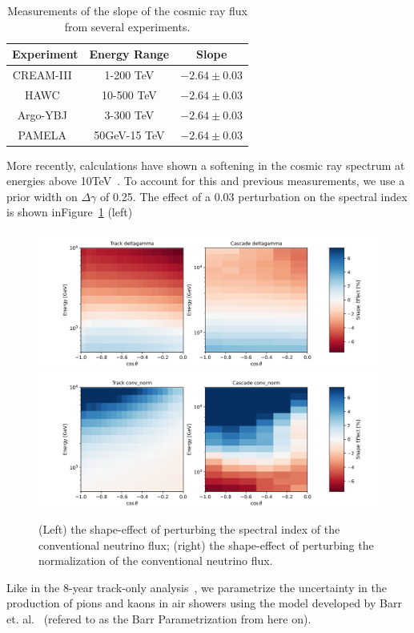 \documentclass[main.tex]{subfiles}
\begin{document}
\begin{table}
    \centering
    \begin{tabular}{|c | cc|}\hline
        Experiment & Energy Range & Slope \\\hline
        CREAM-III~\cite{Yoon_2017} & 1-200 TeV & $-2.64\pm 0.03$ \\
        HAWC~\cite{PhysRevD.96.122001} & 10-500 TeV & $-2.64\pm 0.03$ \\
        Argo-YBJ~\cite{IACOVACCI2013157} & 3-300 TeV & $-2.64\pm 0.03$ \\
        PAMELA~\cite{astra-7-235-2011} & 50GeV-15 TeV & $-2.64\pm 0.03$ \\\hline
    \end{tabular}
    \caption{Measurements of the slope of the cosmic ray flux from several experiments.}\label{tab:spectral}
\end{table}

More recently, calculations have shown a softening in the cosmic ray spectrum at energies above 10TeV~\cite{LIPARI2020102441}. 
To account for this and previous measurements, we use a prior width on $\Delta \gamma$ of 0.25. 
The effect of a 0.03 perturbation on the spectral index is shown inFigure~\ref{fig:deltagamma} (left)


\begin{figure}
    \centering
    \includegraphics[width=0.45\linewidth]{figures/systematics/deltagamma.png}
    \includegraphics[width=0.45\linewidth]{figures/systematics/conv_norm.png}
    \caption{(Left) the shape-effect of perturbing the spectral index of the conventional neutrino flux; (right) the shape-effect of perturbing the normalization of the conventional neutrino flux.}\label{fig:deltagamma}
\end{figure}


Like in the 8-year track-only analysis~\cite{Aartsen_2020,Aartsen_2020_prd}, we parametrize the uncertainty in the production of pions and kaons in air showers using the model developed by Barr et. al.~\cite{PhysRevD.74.094009} (refered to as the Barr Parametrization from here on). 
\end{document}
